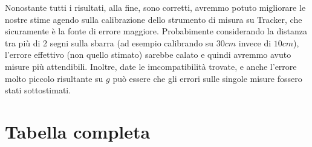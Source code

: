 \documentclass[12pt, a4paper]{article}
\begin{document}
Nonostante tutti i risultati, alla fine, sono corretti, avremmo potuto migliorare le nostre stime agendo sulla calibrazione dello strumento di misura su Tracker, che  sicuramente è la fonte di errore maggiore. Probabimente considerando la distanza tra più di 2 segni sulla sbarra (ad esempio calibrando su $30cm$ invece di $10cm$), l'errore effettivo (non quello stimato) sarebbe calato e quindi avremmo avuto misure più attendibili.
Inoltre, date le imcompatibilità trovate, e anche l'errore molto piccolo risultante su $g$ può essere che gli errori sulle singole misure fossero stati sottostimati.





\newpage
\section{Tabella completa}
\end{document}

